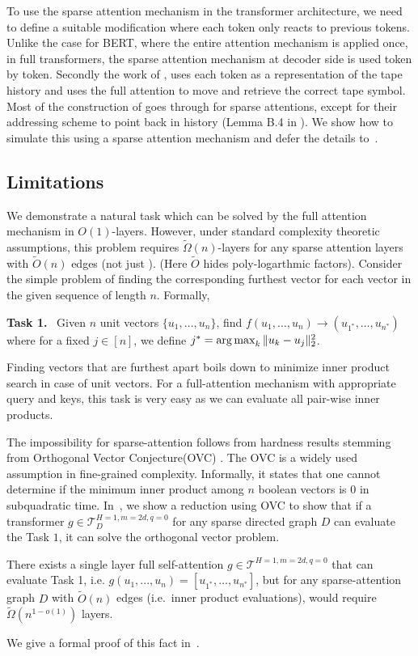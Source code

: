 To use the sparse attention mechanism in the transformer architecture, we need to 
define a suitable modification where each token only reacts to previous tokens. 
Unlike the case for BERT, where the entire attention mechanism is applied once, in  full 
transformers, the sparse attention mechanism at decoder side is used token by token. 
Secondly the work of \citet{Perez19}, uses each token as a representation of the tape 
history and  uses the full attention to move and retrieve the correct tape symbol.
Most of the construction of \citet{Perez19} goes through for sparse attentions, except for their 
addressing scheme to point back in history (Lemma B.4 in \citep{Perez19}).
We show how to simulate this using a sparse attention mechanism and defer the 
details to~.

\subsection{Limitations}
\label{sec:limit}
We demonstrate a natural task which can be solved by the full attention mechanism in $O(1)$-layers.
However, under standard complexity theoretic assumptions, this problem requires 
$\tilde{\Omega}(n)$-layers for any sparse attention layers with $\tilde{O}(n)$ edges (not just \bigb). (Here $\tilde{O}$ hides poly-logarthmic  factors). 
Consider the simple problem of finding the corresponding furthest vector 
for each vector in the given sequence of length $n$. Formally,

\textbf{Task 1.} \ Given $n$ unit vectors $\{u_1,\dots,u_n\}$, find $f(u_1,\dots,u_n) \to (u_{1^*}, \dots, u_{n^*})$  where for a fixed $j \in [n]$, we define $ j^* = \operatorname*{arg\,max}_{k} \|u_k - u_j\|_2^2$.

Finding vectors that are furthest apart boils down to minimize 
inner product search in case of unit vectors. For a full-attention mechanism 
with appropriate query 
and keys, this task is very easy as we can evaluate all pair-wise inner products. 

The impossibility for sparse-attention follows from hardness results 
stemming from Orthogonal Vector Conjecture(OVC) \citep{abboud2014consequences,abboud2015tight,backurs2015edit,williams2005new}. The OVC  is a widely used assumption
in fine-grained complexity. Informally, it states that one cannot determine if the minimum inner product among 
$n$ boolean vectors is $0$ in subquadratic time. In~, we show a 
reduction using  OVC to show that if a transformer $g \in \mathcal{T}_D^{H=1,m=2d,q=0}$ for 
any sparse directed graph $D$ can evaluate the Task $1$, it can solve the orthogonal vector problem.
\begin{proposition}
    There exists a single layer full self-attention $g\in\mathcal{T}^{H=1,m=2d,q=0}$ that can 
    evaluate Task 1,  i.e. $g(u_1,...,u_n) = [u_{1^*},\dots, u_{n^*}]$, but for any sparse-attention 
    graph $D$ with $\tilde{O}(n)$ edges (i.e.~inner product evaluations), would require $\tilde{\Omega}(n^{1-o(1)})$ layers.
\end{proposition}
\vspace{-3mm}
We give a formal proof of this fact in~.